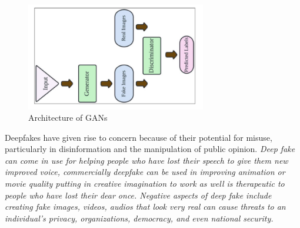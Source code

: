 \begin{figure}[h]
  \centering
  \includegraphics[width=0.7\textwidth]{images/GAN_architecture.PNG} 
  \caption{Architecture of GANs \cite{khanSystematicReviewDeepfake2023}}
  \label{fig:your_label}
\end{figure}
Deepfakes have given rise to concern because of their potential for misuse, particularly in disinformation and the manipulation of public opinion. \emph{Deep fake can come in use for helping people who have lost their speech to give them new improved voice, commercially deepfake can be used in improving animation or movie quality putting in creative imagination to work as well is therapeutic to people who have lost their dear once. Negative aspects of deep fake include creating fake images, videos, audios that look very real can cause threats to an individual’s privacy, organizations, democracy, and even national security.\cite{negiDeepFakeUnderstanding2021}}
